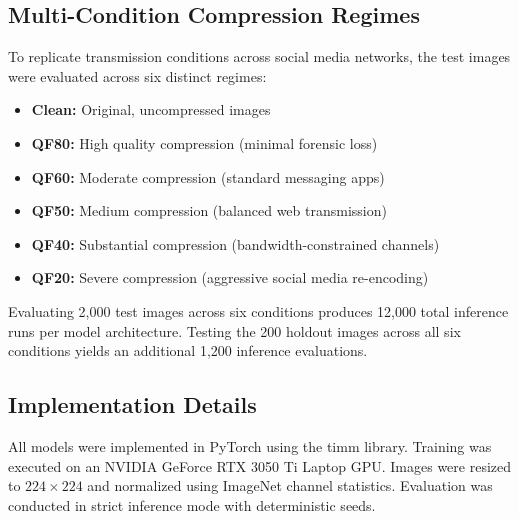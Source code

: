 \documentclass[conference]{IEEEtran}
\begin{document}
\subsection{Multi-Condition Compression Regimes}
To replicate transmission conditions across social media networks, the test images were evaluated across six distinct regimes:
\begin{itemize}
    \item \textbf{Clean:} Original, uncompressed images
    \item \textbf{QF80:} High quality compression (minimal forensic loss)
    \item \textbf{QF60:} Moderate compression (standard messaging apps)
    \item \textbf{QF50:} Medium compression (balanced web transmission)
    \item \textbf{QF40:} Substantial compression (bandwidth-constrained channels)
    \item \textbf{QF20:} Severe compression (aggressive social media re-encoding)
\end{itemize}
Evaluating 2,000 test images across six conditions produces 12,000 total inference runs per model architecture. Testing the 200 holdout images across all six conditions yields an additional 1,200 inference evaluations.

\subsection{Implementation Details}
All models were implemented in PyTorch using the timm library. Training was executed on an NVIDIA GeForce RTX 3050 Ti Laptop GPU. Images were resized to $224 \times 224$ and normalized using ImageNet channel statistics. Evaluation was conducted in strict inference mode with deterministic seeds.
\end{document}
